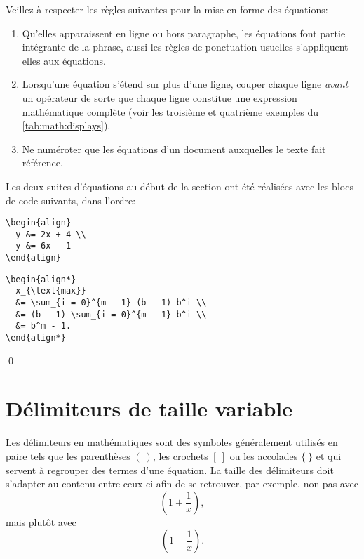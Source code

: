 \begin{conseil}
  Veillez à respecter les règles suivantes pour la mise en forme des
  équations:
  \begin{enumerate}
  \item Qu'elles apparaissent en ligne ou hors paragraphe, les
    équations font partie intégrante de la phrase, aussi les règles de
    ponctuation usuelles s'appliquent-elles aux équations.
  \item Lorsqu'une équation s'étend sur plus d'une ligne, couper
    chaque ligne \emph{avant} un opérateur de sorte que chaque ligne
    constitue une expression mathématique complète (voir les troisième
    et quatrième exemples du \autoref{tab:math:displays}).
  \item Ne numéroter que les équations d'un document auxquelles le
    texte fait référence.
  \end{enumerate}
\end{conseil}

\begin{exemple}
  Les deux suites d'équations au début de la section ont été réalisées
  avec les blocs de code suivants, dans l'ordre:
\begin{lstlisting}
\begin{align}
  y &= 2x + 4 \\
  y &= 6x - 1
\end{align}
\end{lstlisting}
\begin{lstlisting}
\begin{align*}
  x_{\text{max}}
  &= \sum_{i = 0}^{m - 1} (b - 1) b^i \\
  &= (b - 1) \sum_{i = 0}^{m - 1} b^i \\
  &= b^m - 1.
\end{align*}
\end{lstlisting}
  \qed
\end{exemple}


\section{Délimiteurs de taille variable}
\label{sec:math:delimiteurs}

Les délimiteurs en mathématiques sont des symboles généralement
utilisés en paire tels que les parenthèses $(~)$, les crochets $[~]$
ou les accolades $\{~\}$ et qui servent à regrouper des termes d'une
équation. La taille des délimiteurs doit s'adapter au contenu entre
ceux-ci afin de se retrouver, par exemple, non pas avec
\begin{equation*}
  (1 + \frac{1}{x}),
\end{equation*}
mais plutôt avec
\begin{equation*}
  \left( 1 + \frac{1}{x} \right).
\end{equation*}


